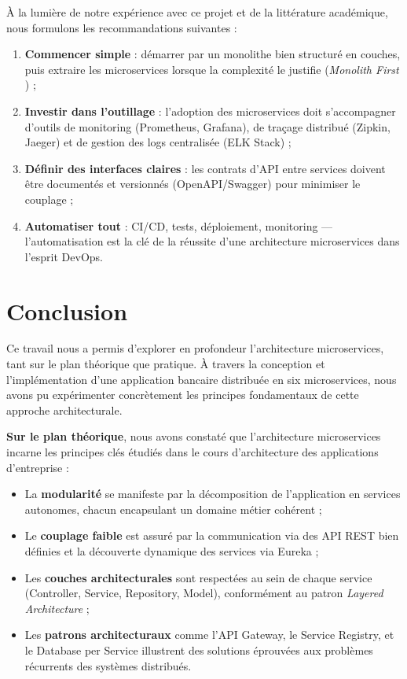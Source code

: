 \documentclass[12pt,a4paper]{article}
\begin{document}
À la lumière de notre expérience avec ce projet et de la littérature académique, nous formulons les recommandations suivantes :

\begin{enumerate}
    \item \textbf{Commencer simple} : démarrer par un monolithe bien structuré en couches, puis extraire les microservices lorsque la complexité le justifie (\textit{Monolith First} \cite{fowler2015}) ;
    \item \textbf{Investir dans l'outillage} : l'adoption des microservices doit s'accompagner d'outils de monitoring (Prometheus, Grafana), de traçage distribué (Zipkin, Jaeger) et de gestion des logs centralisée (ELK Stack) ;
    \item \textbf{Définir des interfaces claires} : les contrats d'API entre services doivent être documentés et versionnés (OpenAPI/Swagger) pour minimiser le couplage ;
    \item \textbf{Automatiser tout} : CI/CD, tests, déploiement, monitoring --- l'automatisation est la clé de la réussite d'une architecture microservices dans l'esprit DevOps.
\end{enumerate}

\section{Conclusion}

Ce travail nous a permis d'explorer en profondeur l'architecture microservices, tant sur le plan théorique que pratique. À travers la conception et l'implémentation d'une application bancaire distribuée en six microservices, nous avons pu expérimenter concrètement les principes fondamentaux de cette approche architecturale.

\textbf{Sur le plan théorique}, nous avons constaté que l'architecture microservices incarne les principes clés étudiés dans le cours d'architecture des applications d'entreprise :

\begin{itemize}
    \item La \textbf{modularité} se manifeste par la décomposition de l'application en services autonomes, chacun encapsulant un domaine métier cohérent ;
    \item Le \textbf{couplage faible} est assuré par la communication via des API REST bien définies et la découverte dynamique des services via Eureka ;
    \item Les \textbf{couches architecturales} sont respectées au sein de chaque service (Controller, Service, Repository, Model), conformément au patron \textit{Layered Architecture} ;
    \item Les \textbf{patrons architecturaux} comme l'API Gateway, le Service Registry, et le Database per Service illustrent des solutions éprouvées aux problèmes récurrents des systèmes distribués.
\end{itemize}
\end{document}
